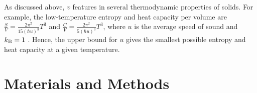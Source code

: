 \documentclass[aps,prl,groupedaddress,fleqn,twocolumn,10pt]{revtex4}
\begin{document}

As discussed above, $v$ features in several thermodynamic properties of solids. For example, the low-temperature entropy and heat capacity per volume are $\frac{S}{V}=\frac{2\pi^2}{15(\hbar u)^3}T^3$ and $\frac{C}{V}=\frac{2\pi^2}{5(\hbar u)^3}T^3$, where $u$ is the average speed of sound and $k_{\rm B}=1$ \cite{landau}. Hence, the upper bound for $u$ gives the smallest possible entropy and heat capacity at a given temperature.

\section{Materials and Methods}
\end{document}
